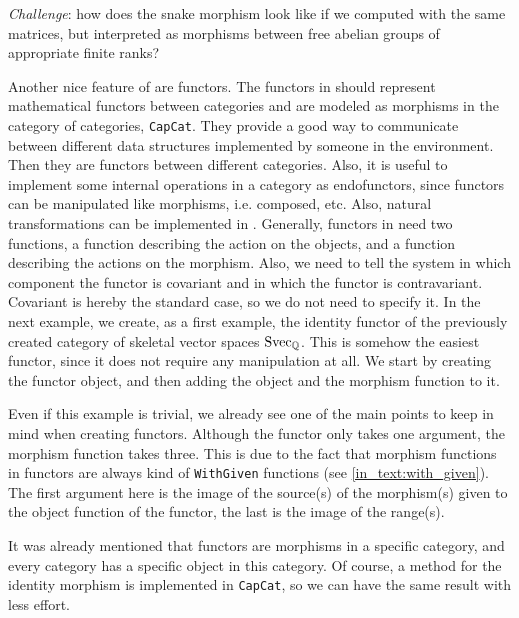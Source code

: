 \begin{small}
 
\end{small}
\emph{Challenge}: how does the snake morphism look like if we computed with the same matrices, but interpreted 
as morphisms between free abelian groups of appropriate finite ranks?

Another nice feature of \CapPkg are functors. The functors in \CapPkg should represent mathematical functors between categories and are modeled
as morphisms in the \CapPkg category of categories, \texttt{CapCat}. They provide a good way to communicate between different data structures implemented
by someone in the \CapPkg environment. Then they are functors between different categories. Also, it is useful to implement some internal operations
in a category as endofunctors, since functors can be manipulated like morphisms, i.e. composed, etc. Also, natural transformations can be implemented in
\CapPkg. Generally, functors in \CapPkg need two functions, a function describing the action on the objects, and a function describing the actions on the
morphism. Also, we need to tell the system in which component the functor is covariant and in which the functor is contravariant. Covariant is hereby the standard
case, so we do not need to specify it.
In the next example, we create, as a first example, the identity functor of the previously created category of skeletal vector spaces $\mathrm{Svec}_{\mathbb{Q}}$. This is somehow the easiest functor,
since it does not require any manipulation at all. We start by creating the functor object, and then adding the object and the morphism function to it.

\begin{small}
 
\end{small}

Even if this example is trivial, we already see one of the main points to keep in mind when creating functors. Although the functor only takes one argument,
the morphism function takes three. This is due to the fact that morphism functions in functors are always kind of \texttt{WithGiven} functions
(see \ref{in_text:with_given}). The first
argument here is the image of the source(s) of the morphism(s) given to the object function of the functor, the last is the image of the range(s).

It was already mentioned that functors are morphisms in a specific category, and every \CapPkg category has a specific object in this category.
Of course, a method for the identity morphism is implemented in \texttt{CapCat}, so we can have the same result with less effort.

